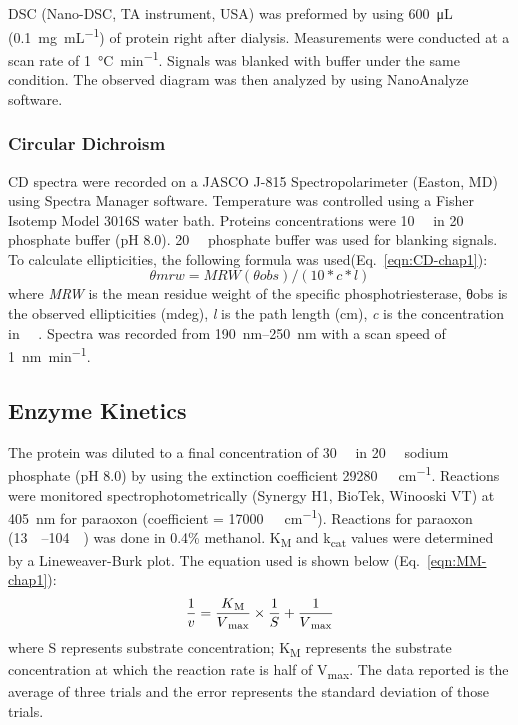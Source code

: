 \begin{refsection}
DSC (Nano-DSC, TA instrument, USA) was preformed by using \SI{600}{\micro\L}
(\SI{0.1}{\mg\per\mL}) of protein right after dialysis. Measurements were
conducted at a scan rate of \SI{1}{\celsius\per\minute}. Signals was blanked with
buffer under the same condition.  The observed diagram was then analyzed by
using NanoAnalyze software.

\subsubsection{Circular Dichroism}
\label{sec:cd-method}

CD spectra were recorded on a JASCO J-815 Spectropolarimeter (Easton, MD) using
Spectra Manager software. Temperature was controlled using a Fisher Isotemp
Model 3016S water bath. Proteins concentrations were \SI{10}{\micro\Molar} in
\SI{20}{\milli\Molar} phosphate buffer (pH 8.0). \SI{20}{\milli\Molar}
phosphate buffer was used for blanking signals. To calculate ellipticities, the
following formula was used(Eq.~\ref{eqn:CD-chap1}): 
\begin{equation}
    θmrw = MRW(θobs) / (10 * c * l) 
    \label{eqn:CD-chap1}
\end{equation}
where \emph{MRW} is the mean residue weight of the specific phosphotriesterase,
θobs is the observed ellipticities (mdeg), \emph{l} is the path length (cm),
\emph{c} is the concentration in \SI{}{\micro\Molar}. Spectra was recorded from
\SIrange{190}{250}{\nm} with a scan speed of \SI{1}{\nano\meter\per\minute}.

\subsection{Enzyme Kinetics}
\label{sec:kinetics-method}

The protein was diluted to a final concentration of \SI{30}{\nano\Molar} in
\SI{20}{\milli\Molar} sodium phosphate (pH 8.0) by using the extinction
coefficient \SI{29280}{\per\Molar\per\cm}. Reactions were monitored
spectrophotometrically (Synergy H1, BioTek, Winooski VT) at \SI{405}{\nm} for
paraoxon (coefficient = \SI{17000}{\per\Molar\per\cm}).  Reactions for paraoxon
(\SIrange{13}{104}{\micro\Molar}) was done in 0.4\% methanol.
K\textsubscript{M} and k\textsubscript{cat} values were determined by a
Lineweaver-Burk plot.\cite{Baker2011b} The equation used is shown below
(Eq.~\ref{eqn:MM-chap1}): 
\begin{equation} 
    \frac{1}{v} =
    \frac{K\textsubscript{M}}{V\textsubscript{max}}\times\frac{1}{S} +
    \frac{1}{V\textsubscript{max}} 
    \label{eqn:MM-chap1}
\end{equation}
where S represents substrate concentration; K\textsubscript{M} represents the
substrate concentration at which the reaction rate is half of
V\textsubscript{max}. The data reported is the average of three trials and the
error represents the standard deviation of those trials.


\end{refsection}
